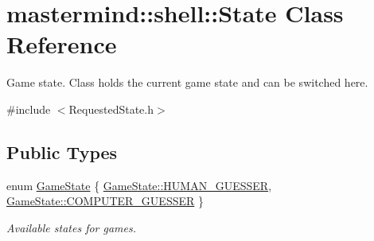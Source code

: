 \hypertarget{classmastermind_1_1shell_1_1_state}{}\section{mastermind\+:\+:shell\+:\+:State Class Reference}
\label{classmastermind_1_1shell_1_1_state}


Game state. Class holds the current game state and can be switched here.  




{\ttfamily \#include $<$Requested\+State.\+h$>$}

\subsection*{Public Types}
\begin{DoxyCompactItemize}
\item 
enum \hyperlink{classmastermind_1_1shell_1_1_state_a7667dd4920335355f616e9ffc2793d0b}{Game\+State} \{ \hyperlink{classmastermind_1_1shell_1_1_state_a7667dd4920335355f616e9ffc2793d0ba58938eb78fd16b966e8405452fb2da30}{Game\+State\+::\+H\+U\+M\+A\+N\+\_\+\+G\+U\+E\+S\+S\+ER}, 
\hyperlink{classmastermind_1_1shell_1_1_state_a7667dd4920335355f616e9ffc2793d0ba84b5fa7693dd3d10179d362478250c17}{Game\+State\+::\+C\+O\+M\+P\+U\+T\+E\+R\+\_\+\+G\+U\+E\+S\+S\+ER}
 \}\begin{DoxyCompactList}\small\item\em Available states for games. \end{DoxyCompactList}
\end{DoxyCompactItemize}
